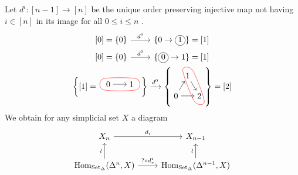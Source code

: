 \begin{comment}
    
By Yoneda we obtain an isomorphism $\Hom_{\Set_{\Delta}}(\Delta(-,n),X) \isomorphism X_n$. 
Let $x \in X_n$ and let $\Delta^n \coloneqq \Delta(-,n)$ we obtain the following diagram
\[
\begin{tikzcd}
    \Delta^n
    \arrow[rr, "x"]
    \arrow[rd, "\sigma_x"']
    &
    &
    X
    \\
    &
    \Delta^m
    \arrow[ru , "y"']
\end{tikzcd}
\]
\todo{unsure what all is happening here}
\end{comment}

Let $d^i\colon[n-1] \to [n]$ be the unique order preserving injective map not having $i \in [n]$ in its image for all $0 \leq i \leq n$ .
\[
\begin{tabular}{cc}
     \begin{tikzcd}
         \text{[0]}=\{0\}
         \arrow[r, "d^0"]
         &
         \{0 \to \circled{1}\}=[1]
     \end{tikzcd}
     \\
     \begin{tikzcd}
         \text{[}0]=\{0\}
         \arrow[r, "d^0"]
         &
         \{\circled{0} \to 1\}=[1]
     \end{tikzcd}
     \\
     $
     \left\{
     [1]
     =
     \begin{tikzpicture}[baseline={(0,-0.2)}]
        \node (A) at (0,0) {$0$};
        \node (B) at (1,0) {$1$};
        \draw [->] (A) -- (B);
        \draw [red] plot [smooth cycle] coordinates {(A.north west) (A.south west) (B.south east) (B.north east) };
     \end{tikzpicture}
     \right\}
     \xrightarrow{d^0}
     \left\{
     \begin{tikzpicture}[baseline={(0,0.3)}]
        \node (A) at (0,0.866) {$1$};
        \node (B) at (-0.5,0) {$0$};
        \node (C) at (0.5,0) {$2$};
        \draw [->] (A) -- (C);
        \draw [->] (B) -- (A);
        \draw [->] (B) -- (C);
        \draw [red] plot [smooth cycle] coordinates {(A.north west) (A.north east) (C.south east) (C.south west) };
    \end{tikzpicture}
     \right\}=[2]
     $
\end{tabular}
\]
We obtain for any simplicial set $ X $ a diagram
\[
\begin{tikzcd}
    X_n 
    \ar[r, " d_i" ]
    &
    X_{n-1}
    \\
    \Hom_{\SetD} ( \Delta^n , X )
    \ar[u, "\sim" {anchor=south, rotate=90} ]
    \ar[r, " ? \circ d^i_* " ]
    &
    \Hom_{\SetD} ( \Delta^{n-1} , X )
    \ar[u, "\sim" {anchor=south, rotate=90} ]
\end{tikzcd}
\]
